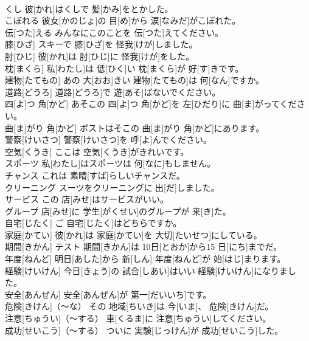 \documentclass[8pt]{extreport}
\begin{document}
\begin{CJK}{UTF8}{min}
\\	くし	彼[かれ]はくしで 髪[かみ]をとかした。		
\\	こぼれる	彼女[かのじょ]の 目[め]から 涙[なみだ]がこぼれた。		
\\	伝[つた]える	みんなにこのことを 伝[つた]えてください。		
\\	膝[ひざ]	スキーで 膝[ひざ]を 怪我[けが]しました。		
\\	肘[ひじ]	彼[かれ]は 肘[ひじ]に 怪我[けが]をした。		
\\	枕[まくら]	私[わたし]は 低[ひく]い 枕[まくら]が 好[す]きです。		
\\	建物[たてもの]	あの 大[おお]きい 建物[たてもの]は 何[なん]ですか。		
\\	道路[どうろ]	道路[どうろ]で 遊[あそ]ばないでください。		
\\	四[よ]つ 角[かど]	あそこの 四[よ]つ 角[かど]を 左[ひだり]に 曲[ま]がってください。		
\\	曲[ま]がり 角[かど]	ポストはそこの 曲[ま]がり 角[かど]にあります。		
\\	警察[けいさつ]	警察[けいさつ]を 呼[よ]んでください。		
\\	空気[くうき]	ここは 空気[くうき]がきれいです。		
\\	スポーツ	私[わたし]はスポーツは 何[なに]もしません。		
\\	チャンス	これは 素晴[すば]らしいチャンスだ。		
\\	クリーニング	スーツをクリーニングに 出[だ]しました。		
\\	サービス	この 店[みせ]はサービスがいい。		
\\	グループ	店[みせ]に 学生[がくせい]のグループが 来[き]た。		
\\	自宅[じたく]	ご 自宅[じたく]はどちらですか。		
\\	家庭[かてい]	彼[かれ]は 家庭[かてい]を 大切[たいせつ]にしている。		
\\	期間[きかん]	テスト 期間[きかん]は 10日[とおか]から15 日[にち]までだ。		
\\	年度[ねんど]	明日[あした]から 新[しん] 年度[ねんど]が 始[はじ]まります。		
\\	経験[けいけん]	今日[きょう]の 試合[しあい]はいい 経験[けいけん]になりました。		
\\	安全[あんぜん]	安全[あんぜん]が 第一[だいいち]です。		
\\	危険[きけん]（～な）	その 地域[ちいき]は 今[いま]、 危険[きけん]だ。		
\\	注意[ちゅうい]（～する）	車[くるま]に 注意[ちゅうい]してください。		
\\	成功[せいこう]（～する）	ついに 実験[じっけん]が 成功[せいこう]した。		

\end{CJK}
\end{document}
